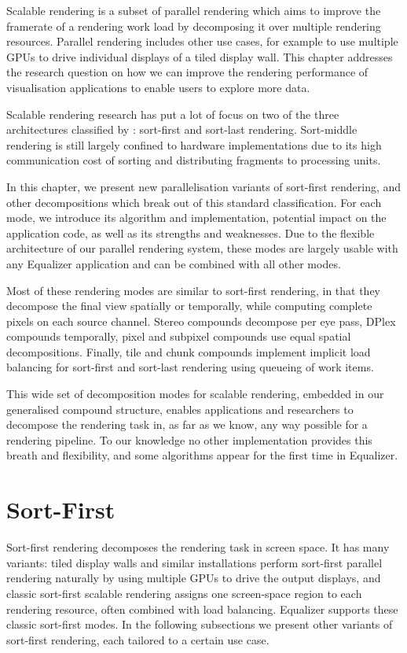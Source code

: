 Scalable rendering is a subset of parallel rendering which aims to improve the
framerate of a rendering work load by decomposing it over multiple rendering
resources. Parallel rendering includes other use cases, for example to use
multiple GPUs to drive individual displays of a tiled display wall. This
chapter addresses the research question on how we can improve the rendering
performance of visualisation applications to enable users to explore more data.

Scalable rendering research has put a lot of focus on two of the three
architectures classified by \cite{Molnar92}: sort-first and sort-last rendering.
Sort-middle rendering is still largely confined to hardware implementations due
to its high communication cost of sorting and distributing fragments to
processing units.

In this chapter, we present new parallelisation variants of sort-first
rendering, and other decompositions which break out of this standard
classification. For each mode, we introduce its algorithm and implementation,
potential impact on the application code, as well as its strengths and
weaknesses. Due to the flexible architecture of our parallel rendering system,
these modes are largely usable with any Equalizer application and can be
combined with all other modes.

Most of these rendering modes are similar to sort-first rendering, in that they
decompose the final view spatially or temporally, while computing complete
pixels on each source channel. Stereo compounds decompose per eye pass, DPlex
compounds temporally, pixel and subpixel compounds use equal spatial
decompositions. Finally, tile and chunk compounds implement implicit
load balancing for sort-first and sort-last rendering using queueing of work
items.

This wide set of decomposition modes for scalable rendering, embedded in our
generalised compound structure, enables applications and researchers to
decompose the rendering task in, as far as we know, any way possible for a
rendering pipeline. To our knowledge no other implementation provides this
breath and flexibility, and some algorithms appear for the first time in
Equalizer.

\section{Sort-First}

Sort-first rendering decomposes the rendering task in screen space. It has many
variants: tiled display walls and similar installations perform sort-first
parallel rendering naturally by using multiple GPUs to drive the output
displays, and classic sort-first scalable rendering assigns one screen-space
region to each rendering resource, often combined with load balancing.
Equalizer supports these classic sort-first modes. In the following subsections
we present other variants of sort-first rendering, each tailored to a certain
use case.

